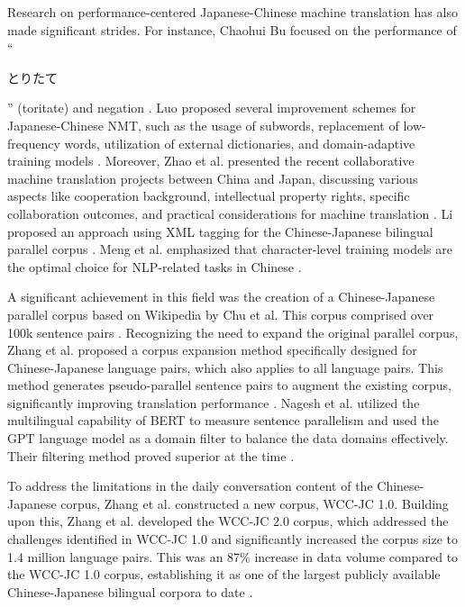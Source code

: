 \documentclass[acmsmall]{acmart}
\begin{document}
Research on performance-centered Japanese-Chinese machine translation has also made significant strides. For instance, Chaohui Bu focused on the performance of ``\begin{CJK}{UTF8}{min} 
とりたて\end{CJK}'' (toritate) and negation \cite{4-2-11}. Luo proposed several improvement schemes for Japanese-Chinese NMT, such as the usage of subwords, replacement of low-frequency words, utilization of external dictionaries, and domain-adaptive training models \cite{4-2-12}. Moreover, Zhao et al. presented the recent collaborative machine translation projects between China and Japan, discussing various aspects like cooperation background, intellectual property rights, specific collaboration outcomes, and practical considerations for machine translation \cite{4-2-13}. Li proposed an approach using XML tagging for the Chinese-Japanese bilingual parallel corpus \cite{4-2-14}. Meng et al. emphasized that character-level training models are the optimal choice for NLP-related tasks in Chinese \cite{n4-33}.

A significant achievement in this field was the creation of a Chinese-Japanese parallel corpus based on Wikipedia by Chu et al. This corpus comprised over 100k sentence pairs \cite{4one}. Recognizing the need to expand the original parallel corpus, Zhang et al. proposed a corpus expansion method specifically designed for Chinese-Japanese language pairs, which also applies to all language pairs. This method generates pseudo-parallel sentence pairs to augment the existing corpus, significantly improving translation performance \cite{4tow}. Nagesh et al. utilized the multilingual capability of BERT to measure sentence parallelism and used the GPT language model as a domain filter to balance the data domains effectively. Their filtering method proved superior at the time \cite{4three}.

To address the limitations in the daily conversation content of the Chinese-Japanese corpus, Zhang et al. constructed a new corpus, WCC-JC 1.0\cite{4four}. Building upon this, Zhang et al. developed the WCC-JC 2.0 corpus, which addressed the challenges identified in WCC-JC 1.0 and significantly increased the corpus size to 1.4 million language pairs. This was an 87\% increase in data volume compared to the WCC-JC 1.0 corpus, establishing it as one of the largest publicly available Chinese-Japanese bilingual corpora to date \cite{4five}.
\end{document}
